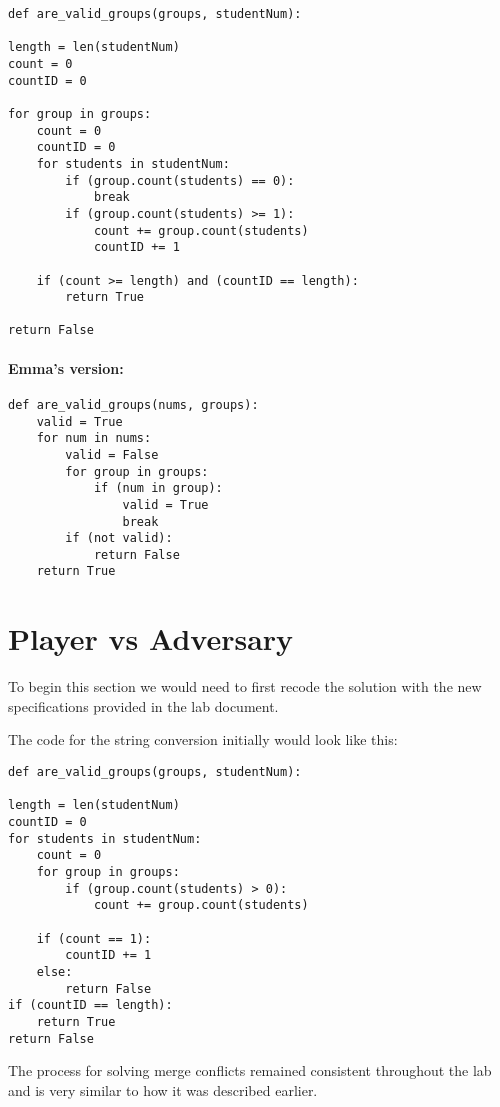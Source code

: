 \documentclass[twocolumn, 10pt]{article}
\begin{document}
\footnotesize
\begin{verbatim}
def are_valid_groups(groups, studentNum):

length = len(studentNum)
count = 0
countID = 0

for group in groups:
    count = 0
    countID = 0
    for students in studentNum:
        if (group.count(students) == 0):
            break
        if (group.count(students) >= 1):
            count += group.count(students)
            countID += 1
    
    if (count >= length) and (countID == length):
        return True
    
return False
\end{verbatim}
\normalsize

\paragraph{Emma's version:}

\footnotesize
\begin{verbatim}
def are_valid_groups(nums, groups):
    valid = True
    for num in nums:
        valid = False
        for group in groups:
            if (num in group): 
                valid = True
                break
        if (not valid):
            return False
    return True
\end{verbatim}
\normalsize

\section{Player vs Adversary}

To begin this section we would need to first recode the solution with the new specifications provided in the lab document. 

The code for the string conversion initially would look like this:

\footnotesize
\begin{verbatim}
def are_valid_groups(groups, studentNum):

length = len(studentNum)
countID = 0   
for students in studentNum:
    count = 0
    for group in groups:
        if (group.count(students) > 0):
            count += group.count(students)

    if (count == 1):
        countID += 1
    else:
        return False
if (countID == length):
    return True
return False
\end{verbatim}
\normalsize

The process for solving merge conflicts remained consistent throughout the lab and is very similar to how it was described earlier.
\end{document}
